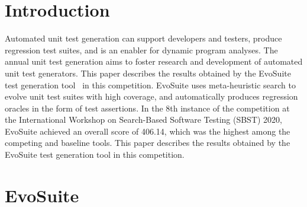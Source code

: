 \documentclass[sigconf]{acmart}
\newcommand{\EVOSUITE}{{\sc EvoSuite}\xspace}
\newcommand{\TOTALPOINTS}{{406.14}\xspace}
\begin{document}
\maketitle

\section{Introduction}


Automated unit test generation can support developers and testers, produce
regression test suites, and is an enabler for dynamic program analyses. The
annual unit test generation aims to foster research and development of
automated unit test generators. This paper describes the results obtained by
the \EVOSUITE test generation tool~\cite{FrA11c} in this competition. \EVOSUITE
uses meta-heuristic search to evolve unit test suites with high
coverage, and automatically produces regression oracles in the form of test
assertions. In the 8th instance of the competition at the International
Workshop on Search-Based Software Testing (SBST) 2020, \EVOSUITE achieved an
overall score of \TOTALPOINTS, which was the highest among the competing and
baseline tools. This paper describes the results obtained by the \EVOSUITE test
generation tool in this competition.



\section{\EVOSUITE}
\end{document}
